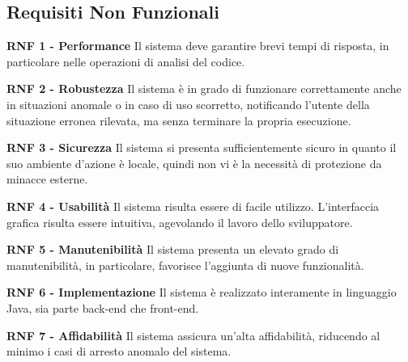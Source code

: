 \subsection{Requisiti Non Funzionali}
\begin{list}{-}{}
	
	\item \textbf{RNF 1 - Performance}
	\newline Il sistema deve garantire brevi tempi di risposta, in particolare nelle operazioni di analisi del codice.  
	\item \textbf{RNF 2 - Robustezza}
	\newline Il sistema è in grado di funzionare correttamente anche in situazioni anomale o in caso di uso scorretto, notificando l'utente della situazione erronea rilevata, ma senza terminare la propria esecuzione. 
	\item \textbf{RNF 3 - Sicurezza}
	\newline Il sistema si presenta sufficientemente sicuro in quanto il suo ambiente d'azione è locale, quindi non vi è la necessità di protezione da minacce esterne.
	\item \textbf{RNF 4 - Usabilità}
	\newline Il sistema risulta essere di facile utilizzo. L'interfaccia grafica risulta essere intuitiva, agevolando il lavoro dello sviluppatore. 
	\item \textbf{RNF 5 - Manutenibilità}
	\newline Il sistema presenta un elevato grado di manutenibilità, in particolare, favorisce l'aggiunta di nuove funzionalità.
	\item \textbf{RNF 6 - Implementazione}
	\newline Il sistema è realizzato interamente in linguaggio Java, sia parte back-end che front-end. 
	\item \textbf{RNF 7 - Affidabilità}
	\newline Il sistema assicura un'alta affidabilità, riducendo al minimo i casi di arresto anomalo del sistema.
\end{list}

